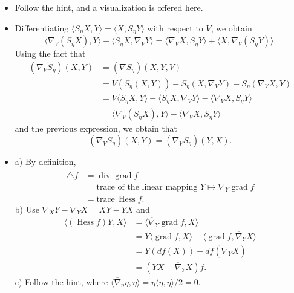 \begin{itemize}
    \item[9.] Follow the hint, and a visualization is offered here.

    \item[10.] Differentiating $\langle S_\eta X,Y\rangle
    =\langle X,S_\eta Y\rangle$ with respect to $V$, we obtain
    \[\langle\nabla_V(S_\eta X),Y\rangle+\langle S_\eta X,\nabla_VY\rangle
    =\langle\nabla_VX,S_\eta Y\rangle+\langle X,\nabla_V(S_\eta Y)\rangle.\]
    Using the fact that
    \begin{align*}
        (\nabla_VS_\eta)(X,Y)&=(\nabla S_\eta)(X,Y,V)\\
        &=V(S_\eta(X,Y))-S_\eta(X,\nabla_VY)-S_\eta(\nabla_VX,Y)\\
        &=V\langle S_\eta X,Y\rangle-\langle S_\eta X,\nabla_VY\rangle
        -\langle\nabla_VX,S_\eta Y\rangle\\
        &=\langle\nabla_V(S_\eta X),Y\rangle-\langle\nabla_VX,S_\eta Y\rangle
    \end{align*}
    and the previous expression, we obtain that
    \[(\nabla_VS_\eta)(X,Y)=(\nabla_VS_\eta)(Y,X).\]

    \item[11.] a) By definition,
    \begin{align*}
        \overline{\triangle}f&=\operatorname{div}\operatorname{grad}f\\
        &=\text{trace of the linear mapping }Y\mapsto\nabla_Y\operatorname{grad}f\\
        &=\text{trace}\,\operatorname{Hess}f.
    \end{align*}
    b) Use $\overline{\nabla}_XY-\overline{\nabla}_YX=XY-YX$ and
    \begin{align*}
        \langle(\operatorname{Hess}f)Y,X\rangle
        &=\langle\overline{\nabla}_Y\operatorname{grad}f,X\rangle\\
        &=Y\langle\operatorname{grad}f,X\rangle
        -\langle\operatorname{grad}f,\overline{\nabla}_YX\rangle\\
        &=Y(df(X))-df(\overline{\nabla}_YX)\\
        &=(YX-\overline{\nabla}_YX)f.
    \end{align*}
    c) Follow the hint, where $\langle\overline{\nabla}_\eta\eta,\eta\rangle
    =\eta\langle\eta,\eta\rangle/2=0$.


\end{itemize}
